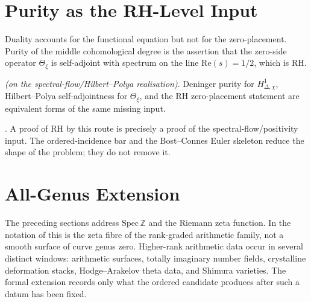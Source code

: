 \section{Purity as the RH-Level Input}
\label{v4-arith:w8-a:purity}

Duality accounts for the functional equation but not for the
zero-placement. Purity of the middle cohomological degree is the
assertion that the zero-side operator \(\Theta_\xi\) is self-adjoint
with spectrum on the line \(\mathrm{Re}(s)=1/2\), which is RH.

\begin{theorem}
\label{v4-arith:w8-a:thm:purity-equivalence}
\ClaimStatusConditional \emph{(on the spectral-flow/Hilbert--Polya
realisation)}. Deninger purity for
\(H^1_{\Delta,\chi}\), Hilbert--Polya self-adjointness for
\(\Theta_\xi\), and the RH zero-placement statement are equivalent
forms of the same missing input.
\end{theorem}

\begin{corollary}
\label{v4-arith:w8-a:cor:rh-construction}
\ClaimStatusConditional. A proof of RH by this route is precisely a
proof of the spectral-flow/positivity input. The ordered-incidence bar
and the Bost--Connes Euler skeleton reduce the shape of the problem;
they do not remove it.
\end{corollary}

\section{All-Genus Extension}
\label{v4-arith:w8-a:all-genus}

The preceding sections address
\(\overline{\mathrm{Spec}\,\mathbb{Z}}\) and the Riemann zeta function.
In the notation of
 this is the zeta fibre of the
rank-graded arithmetic family, not a smooth surface of curve genus
zero. Higher-rank arithmetic data occur in several distinct windows:
arithmetic surfaces, totally imaginary number fields, crystalline
deformation stacks, Hodge--Arakelov theta data, and Shimura varieties.
The formal extension records only what the ordered candidate produces
after such a datum has been fixed.

